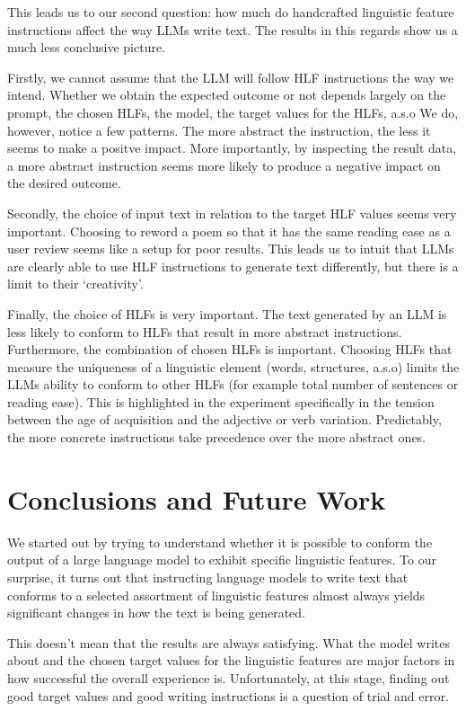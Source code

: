 \documentclass[11pt]{article}
\begin{document}
This leads us to our second question: how much do handcrafted linguistic feature
instructions affect the way LLMs write text.
The results in this regards show us a much less conclusive picture.

Firstly, we cannot assume that the LLM will follow HLF instructions the way we
intend.
Whether we obtain the expected outcome or not depends largely on the prompt,
the chosen HLFs, the model, the target values for the HLFs, a.s.o
We do, however, notice a few patterns.
The more abstract the instruction, the less it seems to make a positve impact.
More importantly, by inspecting the result data, a more abstract instruction
seems more likely to produce a negative impact on the desired outcome.

Secondly, the choice of input text in relation to the target HLF values seems
very important.
Choosing to reword a poem so that it has the same reading ease as a user review
seems like a setup for poor results.
This leads us to intuit that LLMs are clearly able to use HLF instructions to
generate text differently, but there is a limit to their `creativity'.

Finally, the choice of HLFs is very important.
The text generated by an LLM is less likely to conform to HLFs that result in
more abstract instructions.
Furthermore, the combination of chosen HLFs is important.
Choosing HLFs that measure the uniqueness of a linguistic element (words,
structures, a.s.o) limits the LLMs ability to conform to other HLFs (for example
total number of sentences or reading ease).
This is highlighted in the experiment specifically in the tension between the
age of acquisition and the adjective or verb variation.
Predictably, the more concrete instructions take precedence over the more
abstract ones.

\section{Conclusions and Future Work}

We started out by trying to understand whether it is possible to conform the
output of a large language model to exhibit specific linguistic features.
To our surprise, it turns out that instructing language models to write text
that conforms to a selected assortment of linguistic features almost always
yields significant changes in how the text is being generated.

This doesn't mean that the results are always satisfying.
What the model writes about and the chosen target values for the linguistic
features are major factors in how successful the overall experience is.
Unfortunately, at this stage, finding out good target values and good writing
instructions is a question of trial and error.
\end{document}
